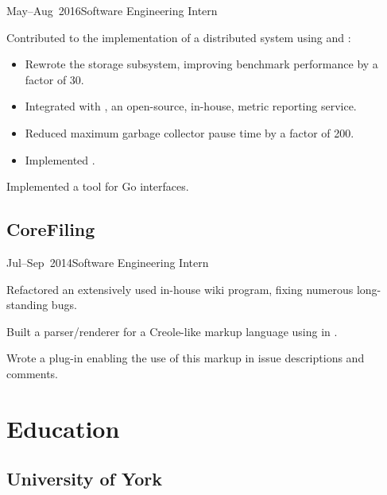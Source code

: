 \documentclass[a4paper]{barrucadu-cv}
\newcommand{\range}[2]{#1–#2}
\begin{document}
\begin{cventry}{\range{May}{Aug}~2016}{Software Engineering Intern}
  \begin{tightitemize}
  \item Contributed to the implementation of a distributed system
    using  and :

    \begin{itemize}
    \item Rewrote the storage subsystem, improving benchmark
      performance by a factor of 30.
    \item Integrated with , an open-source, in-house,
      metric reporting service.
    \item Reduced maximum garbage collector pause time by a factor of
      200.
    \item Implemented .
    \end{itemize}

  \item Implemented a tool for  Go interfaces.
  \end{tightitemize}
\end{cventry}

\subsection{CoreFiling}

\begin{cventry}{\range{Jul}{Sep}~2014}{Software Engineering Intern}
  \begin{tightitemize}
  \item Refactored an extensively used in-house wiki program, fixing
    numerous long-standing bugs.

  \item Built a parser/renderer for a Creole-like markup language
    using  in .

  \item Wrote a  plug-in enabling the use of this markup
    in issue descriptions and comments.
  \end{tightitemize}
\end{cventry}

\section{Education}

\subsection{University of York}
\end{document}
